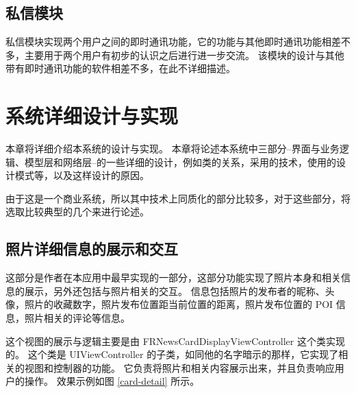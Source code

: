 \section{私信模块}

私信模块实现两个用户之间的即时通讯功能，它的功能与其他即时通讯功能相差不多，主要用于两个用户有初步的认识之后进行进一步交流。
该模块的设计与其他带有即时通讯功能的软件相差不多，在此不详细描述。

\chapter{系统详细设计与实现}
\label{detail-design-implent}

本章将详细介绍本系统的设计与实现。
本章将论述本系统中三部分--界面与业务逻辑、模型层和网络层--的一些详细的设计，例如类的关系，采用的技术，使用的设计模式等，以及这样设计的原因。

由于这是一个商业系统，所以其中技术上同质化的部分比较多，对于这些部分，将选取比较典型的几个来进行论述。

\section{照片详细信息的展示和交互}
\label{photo-detail}

这部分是作者在本应用中最早实现的一部分，这部分功能实现了照片本身和相关信息的展示，另外还包括与照片相关的交互。
信息包括照片的发布者的昵称、头像，照片的收藏数字，照片发布位置距当前位置的距离，照片发布位置的 POI 信息，照片相关的评论等信息。

这个视图的展示与逻辑主要是由 FRNewsCardDisplayViewController 这个类实现的。
这个类是 UIViewController 的子类，如同他的名字暗示的那样，它实现了相关的视图和控制器的功能。
它负责将照片和相关内容展示出来，并且负责响应用户的操作。
效果示例如图 \ref{card-detail} 所示。

